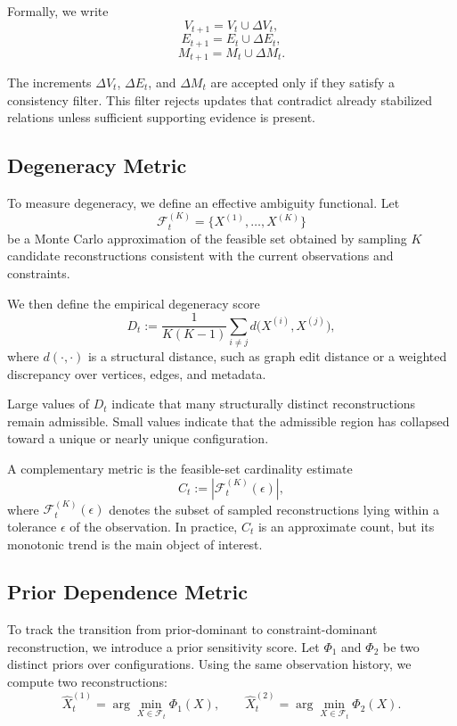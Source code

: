 \documentclass[12pt, oneside]{article}
\theoremstyle{plain}
\theoremstyle{definition}
\theoremstyle{remark}
\begin{document}
Formally, we write
\[
V_{t+1} = V_t \cup \Delta V_t,
\]
\[
E_{t+1} = E_t \cup \Delta E_t,
\]
\[
M_{t+1} = M_t \cup \Delta M_t.
\]

The increments $\Delta V_t$, $\Delta E_t$, and $\Delta M_t$ are accepted only if they satisfy a consistency filter. This filter rejects updates that contradict already stabilized relations unless sufficient supporting evidence is present.

\subsection{Degeneracy Metric}

To measure degeneracy, we define an effective ambiguity functional. Let
\[
\mathcal{F}_t^{(K)} = \{X^{(1)}, \dots, X^{(K)}\}
\]
be a Monte Carlo approximation of the feasible set obtained by sampling $K$ candidate reconstructions consistent with the current observations and constraints.

We then define the empirical degeneracy score
\[
D_t := \frac{1}{K(K-1)} \sum_{i \neq j} d\bigl(X^{(i)}, X^{(j)}\bigr),
\]
where $d(\cdot,\cdot)$ is a structural distance, such as graph edit distance or a weighted discrepancy over vertices, edges, and metadata.

Large values of $D_t$ indicate that many structurally distinct reconstructions remain admissible. Small values indicate that the admissible region has collapsed toward a unique or nearly unique configuration.

A complementary metric is the feasible-set cardinality estimate
\[
C_t := |\mathcal{F}_t^{(K)}(\epsilon)|,
\]
where $\mathcal{F}_t^{(K)}(\epsilon)$ denotes the subset of sampled reconstructions lying within a tolerance $\epsilon$ of the observation. In practice, $C_t$ is an approximate count, but its monotonic trend is the main object of interest.

\subsection{Prior Dependence Metric}

To track the transition from prior-dominant to constraint-dominant reconstruction, we introduce a prior sensitivity score. Let $\Phi_1$ and $\Phi_2$ be two distinct priors over configurations. Using the same observation history, we compute two reconstructions:
\[
\hat{X}_t^{(1)} = \arg\min_{X \in \mathcal{F}_t} \Phi_1(X),
\qquad
\hat{X}_t^{(2)} = \arg\min_{X \in \mathcal{F}_t} \Phi_2(X).
\]
\end{document}
